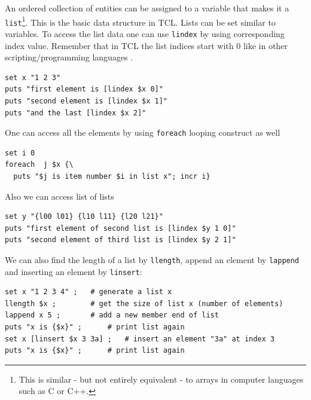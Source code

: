 \documentclass[
paper=a4,                       %
fontsize=11pt,                  %
twoside,                        %
footsepline,                    %
headsepline,                    %
headinclude=false,              %
footinclude=false,              %
pagesize,                       %
]{scrartcl}
\begin{document}
 An ordered collection of entities can be assigned to a variable that 
 makes it a \lstinline|list|\footnote{This is similar - but not entirely equivalent - to
 arrays in computer languages such as C or C++.}. This is the basic data
 structure in TCL. Lists can be set similar to variables.
 To access the list data one can use \lstinline|lindex| by using corresponding 
 index value. Remember that in TCL the list indices start with 0 like in other scripting/programming languages .
 
 {\small\vspace{0,2cm}
\begin{lstlisting}[numbers=none]
set x "1 2 3"
puts "first element is [lindex $x 0]"
puts "second element is [lindex $x 1]"
puts "and the last [lindex $x 2]"
\end{lstlisting}\vspace{0,2cm}
}

\noindent One can access all the elements by using \lstinline|foreach| looping 
construct as well

{\small\vspace{0,2cm}
\begin{lstlisting}[numbers=none]
set i 0
foreach  j $x {\
  puts "$j is item number $i in list x"; incr i}
\end{lstlisting}\vspace{0,2cm}
}

\noindent Also we can access list of lists

{\small\vspace{0,2cm}
\begin{lstlisting}[numbers=none]
set y "{l00 l01} {l10 l11} {l20 l21}"
puts "first element of second list is [lindex $y 1 0]"
puts "second element of third list is [lindex $y 2 1]"
\end{lstlisting}\vspace{0,2cm}
}

\noindent We can also find the length of a list by \lstinline|llength|, append an 
element by \lstinline|lappend| and inserting an element by \lstinline|linsert|:
       
{\small\vspace{0,2cm}
\begin{lstlisting}[numbers=none]
set x "1 2 3 4" ; 	# generate a list x
llength $x ;		# get the size of list x (number of elements)
lappend x 5 ;		# add a new member end of list
puts "x is {$x}" ;		# print list again
set x [linsert $x 3 3a] ;	# insert an element "3a" at index 3
puts "x is {$x}" ;		# print list again
\end{lstlisting}
}\vspace{0,2cm}
\end{document}
